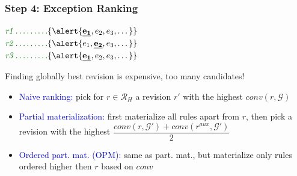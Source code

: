 \documentclass{beamer}
\newcommand{\bl}[1]{\textcolor{blue}{#1}}
\newcommand{\gr}[1]{\textcolor{darkgreen}{#1}}
\def\cG{\ensuremath{\mathcal{G}}}
\def\cR{\ensuremath{\mathcal{R}}}
\newcommand{\mi}[1]{\ensuremath{\mathit{#1}}}
\begin{document}
\begin{frame}\frametitle{Step 4: Exception Ranking}

\begin{center}
$\gr{\mi{r1} \dotsc \dotsc \dotsc} \{\alert{\underline{\mathbf{e_1}},e_2,e_3, \dotsc}\}$\\
 $\gr{\mi{r2} \dotsc \dotsc \dotsc} \{\alert{e_1,\underline{\mathbf{e_2}},e_3, \dotsc}\}$\\
 $\gr{\mi{r3} \dotsc \dotsc \dotsc} \{\alert{\underline{\mathbf{e_1}},e_2,e_3, \dotsc}\}$\\
\end{center}
\bigskip
\begin{beamerboxesrounded}[upper=uppercolred,lower=lowercolred,shadow=true]{}
Finding globally best revision is expensive, too many candidates!
\end{beamerboxesrounded}
\begin{itemize}
\item \bl{Naive ranking:} pick for $r\in \cR_{H}$ a revision $r'$ with the highest $\mi{conv}(r,\cG)$

\bigskip
\bigskip

\item \bl{Partial materialization:} first materialize all rules apart from $r$, then pick a revision with the highest $\dfrac{\mi{conv(r,\cG')+conv(r^{aux},\cG')}}{2}$


\bigskip
\bigskip

\item \bl{Ordered part. mat. (OPM):} same as part. mat., but materialize only rules ordered higher then $r$ based on $\mi{conv}$
\end{itemize}

\end{frame}
\end{document}
